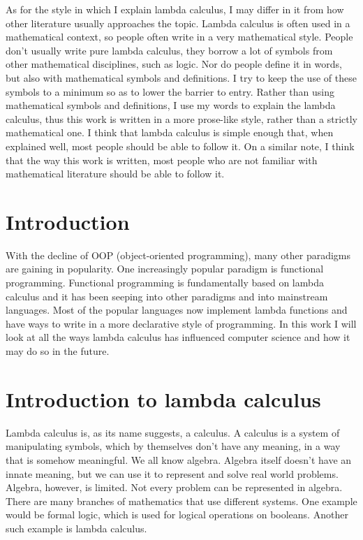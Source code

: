 \documentclass[11pt]{article}
\begin{document}
As for the style in which I explain lambda calculus, I may differ in it from
how other literature usually approaches the topic. Lambda calculus is often
used in a mathematical context, so people often write in a very mathematical
style. People don't usually write pure lambda calculus, they borrow a lot of
symbols from other mathematical disciplines, such as logic. Nor do people
define it in words, but also with mathematical symbols and definitions. I try
to keep the use of these symbols to a minimum so as to lower the barrier to
entry. Rather than using mathematical symbols and definitions, I use my words
to explain the lambda calculus, thus this work is written in a more prose-like
style, rather than a strictly mathematical one. I think that lambda calculus is
simple enough that, when explained well, most people should be able to follow
it. On a similar note, I think that the way this work is written, most people
who are not familiar with mathematical literature should be able to follow it.

\newpage

\tableofcontents
\newpage

\section{Introduction}

With the decline of OOP (object-oriented programming), many other paradigms are
gaining in popularity. One increasingly popular paradigm is functional
programming. Functional programming is fundamentally based on lambda calculus
and it has been seeping into other paradigms and into mainstream languages.
Most of the popular languages now implement lambda functions and have ways to
write in a more declarative style of programming. In this work I will look at
all the ways lambda calculus has influenced computer science and how it may do
so in the future.

\section{Introduction to lambda calculus}

Lambda calculus is, as its name suggests, a calculus. A calculus is a system of
manipulating symbols, which by themselves don't have any meaning, in a way that
is somehow meaningful. We all know algebra. Algebra itself doesn't have an
innate meaning, but we can use it to represent and solve real world problems.
Algebra, however, is limited. Not every problem can be represented in algebra.
There are many branches of mathematics that use different systems. One example
would be formal logic, which is used for logical operations on booleans.
Another such example is lambda calculus.
\end{document}
